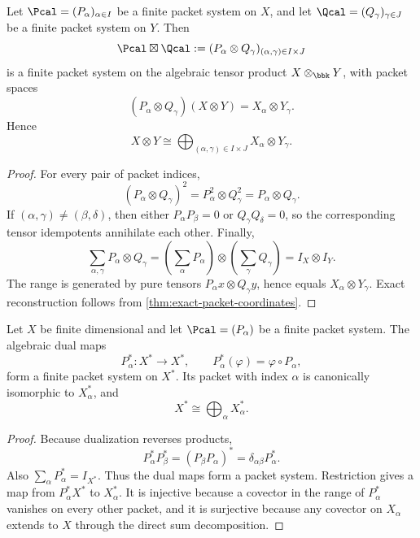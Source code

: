 \begin{theorem}
\label{thm:tensor-packet-system}
Let \(\Pcal=(P_\alpha)_{\alpha\in I}\) be a finite packet system on \(X\), and let \(\Qcal=(Q_\gamma)_{\gamma\in J}\) be a finite packet system on \(Y\).  Then
\[
\Pcal\boxtimes\Qcal
:=
(P_\alpha\otimes Q_\gamma)_{(\alpha,\gamma)\in I\times J}
\]
is a finite packet system on the algebraic tensor product \(X\otimes_{\bbk}Y\), with packet spaces
\[
(P_\alpha\otimes Q_\gamma)(X\otimes Y)
=X_\alpha\otimes Y_\gamma.
\]
Hence
\[
\boxed{
X\otimes Y
\cong
\bigoplus_{(\alpha,\gamma)\in I\times J}
X_\alpha\otimes Y_\gamma.
}
\]
\end{theorem}

\begin{proof}
For every pair of packet indices,
\[
(P_\alpha\otimes Q_\gamma)^2
=P_\alpha^2\otimes Q_\gamma^2
=P_\alpha\otimes Q_\gamma.
\]
If \((\alpha,\gamma)\neq(\beta,\delta)\), then either \(P_\alpha P_\beta=0\) or \(Q_\gamma Q_\delta=0\), so the corresponding tensor idempotents annihilate each other.  Finally,
\[
\sum_{\alpha,\gamma}P_\alpha\otimes Q_\gamma
=
\left(\sum_\alpha P_\alpha\right)
\otimes
\left(\sum_\gamma Q_\gamma\right)
=I_X\otimes I_Y.
\]
The range is generated by pure tensors \(P_\alpha x\otimes Q_\gamma y\), hence equals \(X_\alpha\otimes Y_\gamma\).  Exact reconstruction follows from \cref{thm:exact-packet-coordinates}.
\end{proof}

\begin{proposition}
\label{prop:dual-packet-system}
Let \(X\) be finite dimensional and let \(\Pcal=(P_\alpha)\) be a finite packet system.  The algebraic dual maps
\[
P_\alpha^*:X^*\to X^*,
\qquad
P_\alpha^*(\varphi)=\varphi\circ P_\alpha,
\]
form a finite packet system on \(X^*\).  Its packet with index \(\alpha\) is canonically isomorphic to \(X_\alpha^*\), and
\[
X^*\cong\bigoplus_\alpha X_\alpha^*.
\]
\end{proposition}

\begin{proof}
Because dualization reverses products,
\[
P_\alpha^*P_\beta^*=(P_\beta P_\alpha)^*
=\delta_{\alpha\beta}P_\alpha^*.
\]
Also \(\sum_\alpha P_\alpha^*=I_{X^*}\).  Thus the dual maps form a packet system.  Restriction gives a map from \(P_\alpha^*X^*\) to \(X_\alpha^*\).  It is injective because a covector in the range of \(P_\alpha^*\) vanishes on every other packet, and it is surjective because any covector on \(X_\alpha\) extends to \(X\) through the direct sum decomposition.
\end{proof}

